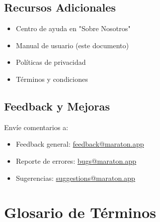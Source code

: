 \documentclass[11pt,a4paper,twoside]{book}
\begin{document}
\section{Recursos Adicionales}

\begin{itemize}
    \item Centro de ayuda en "Sobre Nosotros"
    \item Manual de usuario (este documento)
    \item Políticas de privacidad
    \item Términos y condiciones
\end{itemize}

\section{Feedback y Mejoras}

Envíe comentarios a:
\begin{itemize}
    \item Feedback general: \href{mailto:feedback@maraton.app}{feedback@maraton.app}
    \item Reporte de errores: \href{mailto:bugs@maraton.app}{bugs@maraton.app}
    \item Sugerencias: \href{mailto:suggestions@maraton.app}{suggestions@maraton.app}
\end{itemize}

\appendix

\chapter{Glosario de Términos}
\end{document}
